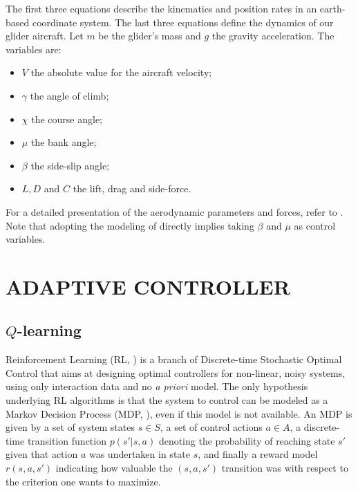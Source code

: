 \documentclass{jfpda}
\begin{document}
The first three equations describe the kinematics and position rates in an earth-based coordinate system. The last three equations define the dynamics of our glider aircraft. Let $m$ be the glider's mass and $g$ the gravity acceleration. The variables are:
\begin{itemize}
\item $V$ the absolute value for the aircraft velocity;
\item $\gamma$ the angle of climb;
\item $\chi$ the course angle;
\item $\mu$ the bank angle;
\item $\beta$ the side-slip angle;
\item $L, D $ and $C$ the lift, drag and side-force.
\end{itemize}

For a detailed presentation of the aerodynamic parameters and forces, refer to \cite{dynamic}.
Note that adopting the modeling of \cite{dynamic} directly implies taking $\beta$ and $\mu$ as control variables.

\section{ADAPTIVE CONTROLLER}
\label{sec:control}

\subsection{$Q$-learning}

Reinforcement Learning (RL, \cite{sutton_book}) is a branch of Discrete-time Stochastic Optimal Control that aims at designing optimal controllers for non-linear, noisy systems, using only interaction data and no \emph{a priori} model. The only hypothesis underlying RL algorithms is that the system to control can be modeled as a Markov Decision Process (MDP, \cite{puterman}), even if this model is not available. An MDP is given by a set of system states $s\in S$, a set of control actions $a\in A$, a discrete-time transition function $p(s'|s,a)$ denoting the probability of reaching state $s'$ given that action $a$ was undertaken in state $s$, and finally a reward model $r(s,a,s')$ indicating how valuable the $(s,a,s')$ transition was with respect to the criterion one wants to maximize.
\end{document}
